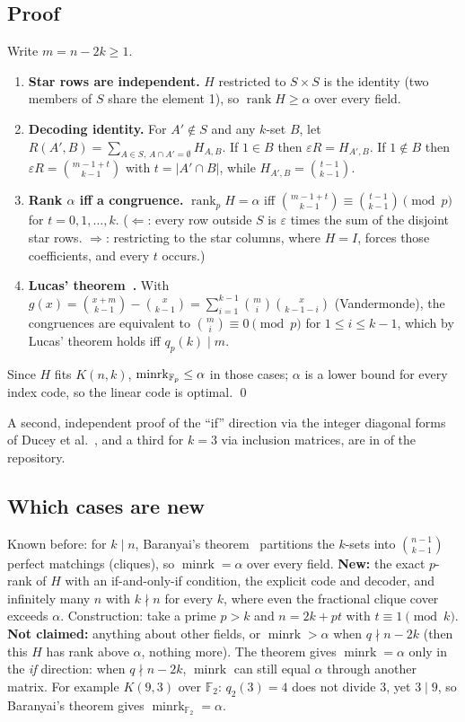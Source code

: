 \subsection{Proof}
Write $m=n-2k\ge1$.
\begin{enumerate}
  \item \textbf{Star rows are independent.} $H$ restricted to $S\times S$ is the identity (two members of $S$ share
  the element 1), so $\operatorname{rank}H\ge\alpha$ over every field.
  \item \textbf{Decoding identity.} For $A'\notin S$ and any $k$-set $B$, let
  $R(A',B)=\sum_{A\in S,\,A\cap A'=\emptyset}H_{A,B}$. If $1\in B$ then $\varepsilon R=H_{A',B}$. If $1\notin B$ then
  $\varepsilon R=\binom{m-1+t}{k-1}$ with $t=|A'\cap B|$, while $H_{A',B}=\binom{t-1}{k-1}$.
  \item \textbf{Rank $\alpha$ iff a congruence.} $\operatorname{rank}_p H=\alpha$ iff
  $\binom{m-1+t}{k-1}\equiv\binom{t-1}{k-1}\pmod p$ for $t=0,1,\dots,k$. ($\Leftarrow$: every row outside $S$ is
  $\varepsilon$ times the sum of the disjoint star rows. $\Rightarrow$: restricting to the star columns, where $H=I$,
  forces those coefficients, and every $t$ occurs.)
  \item \textbf{Lucas' theorem~\cite{lucas}.} With $g(x)=\binom{x+m}{k-1}-\binom{x}{k-1}=\sum_{i=1}^{k-1}\binom{m}{i}\binom{x}{k-1-i}$
  (Vandermonde), the congruences are equivalent to $\binom{m}{i}\equiv0\pmod p$ for $1\le i\le k-1$, which by Lucas'
  theorem holds iff $q_p(k)\mid m$.
\end{enumerate}
Since $H$ fits $K(n,k)$, $\operatorname{minrk}_{\mathbb{F}_p}\le\alpha$ in those cases; $\alpha$ is a lower bound for every
index code, so the linear code is optimal. \qed

A second, independent proof of the ``if'' direction via the integer diagonal forms of Ducey et al.~\cite{ducey},
and a third for $k=3$ via inclusion matrices, are in  of the repository.

\subsection{Which cases are new}
Known before: for $k\mid n$, Baranyai's theorem~\cite{baranyai} partitions the $k$-sets into $\binom{n-1}{k-1}$ perfect matchings
(cliques), so $\operatorname{minrk}=\alpha$ over every field. \textbf{New:} the exact $p$-rank of $H$ with an
if-and-only-if condition, the explicit code and decoder, and infinitely many $n$ with $k\nmid n$ for every $k$, where
even the fractional clique cover exceeds $\alpha$. Construction: take a prime $p>k$ and $n=2k+pt$ with
$t\equiv1\pmod k$. \textbf{Not claimed:} anything about other fields, or $\operatorname{minrk}>\alpha$ when
$q\nmid n-2k$ (then this $H$ has rank above $\alpha$, nothing more). The theorem gives $\operatorname{minrk}=\alpha$ only in the
\emph{if} direction: when $q\nmid n-2k$, $\operatorname{minrk}$ can still equal $\alpha$ through another matrix. For
example $K(9,3)$ over $\mathbb{F}_2$: $q_2(3)=4$ does not divide $3$, yet $3\mid9$, so Baranyai's theorem gives
$\operatorname{minrk}_{\mathbb{F}_2}=\alpha$.

